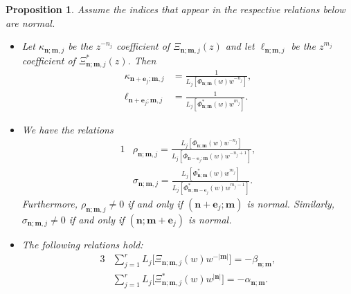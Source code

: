 \documentclass[reqno,centertags,11pt,draft]{amsart}
\newtheorem{prop}[thm]{Proposition}
\newcommand{\Z}{\mathbb{Z}}
\newcommand{\abs}[1]{\left|#1\right|}
\begin{document}
\begin{prop}\label{prop:general hermite pade measures type I}Assume the indices that appear in the respective relations below are normal. 
    \noindent\hfill
    \begin{itemize}
        \item[(i)] Let $\kappa_{\bm{n};\bm{m},j}$ be the $z^{-n_j}$ coefficient of $\Xi_{\bm{n};\bm{m},j}(z)$ and let $\ell_{\bm{n};\bm{m},j}$ be the $z^{m_j}$ coefficient of $\Xi^*_{\bm{n};\bm{m},j}(z)$. Then
        \begin{align}
            \label{eq:kappa}
            \kappa_{\bm{n}+\bm{e}_j;\bm{m},j} & = \frac{1}{L_j[\Phi_{\bm{n};\bm{m}}(w)w^{-n_j}]},
            \\
            \label{eq:l}
            \ell_{\bm{n}+\bm{e}_j;\bm{m},j} &= \frac{1}{L_j[\Phi^*_{\bm{n};\bm{m}}(w)w^{m_j}]}.
        \end{align}
        

        \item[(ii)] We have the relations
        \begin{alignat}{1}
        \label{eq:rho}
            & \rho_{\bm{n};\bm{m},j}= \frac{L_j[\Phi_{\bm{n};\bm{m}}(w)w^{-n_j}]}{L_j[\Phi_{\bm{n}-\bm{e}_j;\bm{m}}(w)w^{-n_j+1}]},
            \\
            \label{eq:sigma}
            & \sigma_{\bm{n};\bm{m},j}= \frac{L_j[\Phi^*_{\bm{n};\bm{m}}(w)w^{m_j}]}{L_j[\Phi^*_{\bm{n};\bm{m}-\bm{e}_j}(w)w^{m_j-1}]}.
        \end{alignat}
        Furthermore, $\rho_{\bm{n};\bm{m},j} \neq 0$ if and only if $(\bm{n}+\bm{e}_j;\bm{m})$ is normal. Similarly, $\sigma_{\bm{n};\bm{m},j} \neq 0$ if and only if $(\bm{n};\bm{m}+\bm{e}_j)$ is normal.
        
        \item[(iii)] The following relations hold:
        \begin{alignat}{3}
            \label{eq:biorthogonality 1}
            & \sum_{j = 1}^r L_j \big[ \Xi_{\bm{n};\bm{m}{,j}}(w)w^{-\abs{\bm{m}}} \big] = -{\beta}_{\bm{n};\bm{m}}, 
            \\ \label{eq:biorthogonality 2}
            & \sum_{j = 1}^r L_j \big[ \Xi_{\bm{n};\bm{m}{,j}}^*(w) w^{\abs{\bm{n}}} \big] = -{\alpha}_{\bm{n};\bm{m}}.
        \end{alignat}
    \end{itemize}
\end{prop}        
\end{document}
